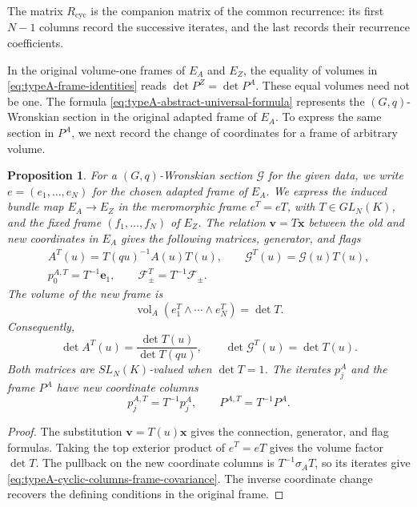 \documentclass[11pt,leqno]{amsart}
\numberwithin{equation}{section}
\theoremstyle{plain}
\newtheorem{proposition}[theorem]{Proposition}
\theoremstyle{definition}
\theoremstyle{plain}
\theoremstyle{definition}
\theoremstyle{remark}
\begin{document}
The matrix $R_{\mathrm{cyc}}$ is the companion matrix of the common recurrence: its first $N-1$ columns record the successive iterates, and the last records their recurrence coefficients.

In the original volume-one frames of $E_A$ and $E_Z$, the equality of volumes in \eqref{eq:typeA-frame-identities} reads $\det P^Z=\det P^A$. These equal volumes need not be one. The formula \eqref{eq:typeA-abstract-universal-formula} represents the $(G,q)$-Wronskian section in the original adapted frame of $E_A$. To express the same section in $P^A$, we next record the change of coordinates for a frame of arbitrary volume.

\begin{proposition}
\label{prop:typeA-Wronskian-frame-covariance}
For a $(G,q)$-Wronskian section $\mathscr G$ for the given data, we write $e=(e_1,\ldots,e_N)$ for the chosen adapted frame of $E_A$. We express the induced bundle map $E_A\to E_Z$ in the meromorphic frame $e^T=eT$, with $T\in GL_N(K)$, and the fixed frame $(f_1,\ldots,f_N)$ of $E_Z$. The relation $\mathbf v=T\mathbf x$ between the old and new coordinates in $E_A$ gives the following matrices, generator, and flags
\begin{equation}\label{eq:typeA-Wronskian-frame-covariance}
 \begin{gathered}
 A^T(u)=T(qu)^{-1}A(u)T(u),\qquad
 \mathscr G^T(u)=\mathscr G(u)T(u),\\
 p_0^{A,T}=T^{-1}\mathbf e_1,\qquad
 \mathcal F_\pm^T=T^{-1}\mathcal F_\pm.
 \end{gathered}
\end{equation}
The volume of the new frame is
\[
 \operatorname{vol}_A(e_1^T\wedge\cdots\wedge e_N^T)=\det T.
\]
Consequently,
\[
 \det A^T(u)=\frac{\det T(u)}{\det T(qu)},
 \qquad
 \det\mathscr G^T(u)=\det T(u).
\]
Both matrices are $SL_N(K)$-valued when $\det T=1$.  The iterates $p_j^A$ and the frame $P^A$ have new coordinate columns
\begin{equation}\label{eq:typeA-cyclic-columns-frame-covariance}
 p_j^{A,T}=T^{-1}p_j^A,\qquad
 P^{A,T}=T^{-1}P^A.
\end{equation}
\end{proposition}
\begin{proof}
The substitution $\mathbf v=T(u)\mathbf x$ gives the connection, generator, and flag formulas.  Taking the top exterior product of $e^T=eT$ gives the volume factor $\det T$.  The pullback on the new coordinate columns is $T^{-1}\sigma_A T$, so its iterates give \eqref{eq:typeA-cyclic-columns-frame-covariance}.  The inverse coordinate change recovers the defining conditions in the original frame.
\end{proof}
\end{document}
